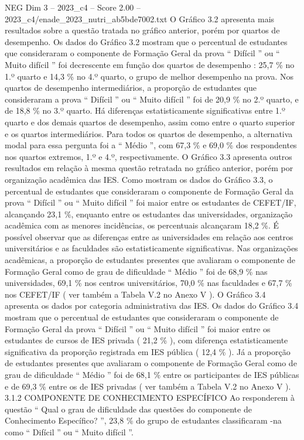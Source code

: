 \begin{textsample}{NEG Dim 3 – 2023\_c4 – Score 2.00 – 2023\_c4/enade\_2023\_nutri\_ab5bde7002.txt}
O Gráfico 3.2 apresenta mais resultados sobre a questão tratada no gráfico anterior, porém por quartos de desempenho.
Os dados do Gráfico 3.2 mostram que o percentual de estudantes que consideraram o componente de Formação Geral da prova “ Difícil ” ou “ Muito difícil ” foi decrescente em função dos quartos de desempenho : 25,7 \% no 1.º quarto e 14,3 \% no 4.º quarto, o grupo de melhor desempenho na prova.
Nos quartos de desempenho intermediários, a proporção de estudantes que consideraram a prova “ Difícil ” ou “ Muito difícil ” foi de 20,9 \% no 2.º quarto, e de 18,8 \% no 3.º quarto.
Há diferenças estatisticamente significativas entre 1.º quarto e dos demais quartos de desempenho, assim como entre o quarto superior e os quartos intermediários.
Para todos os quartos de desempenho, a alternativa modal para essa pergunta foi a “ Médio ”, com 67,3 \% e 69,0 \% dos respondentes nos quartos extremos, 1.º e 4.º, respectivamente.
O Gráfico 3.3 apresenta outros resultados em relação à mesma questão retratada no gráfico anterior, porém por organização acadêmica das IES.
Como mostram os dados do Gráfico 3.3, o percentual de estudantes que consideraram o componente de Formação Geral da prova “ Difícil ” ou “ Muito difícil ” foi maior entre os estudantes de CEFET/IF, alcançando 23,1 \%, enquanto entre os estudantes das universidades, organização acadêmica com as menores incidências, os percentuais alcançaram 18,2 \%.
É possível observar que as diferenças entre as universidades em relação aos centros universitários e as faculdades são estatisticamente significativas.
Nas organizações acadêmicas, a proporção de estudantes presentes que avaliaram o componente de Formação Geral como de grau de dificuldade “ Médio ” foi de 68,9 \% nas universidades, 69,1 \% nos centros universitários, 70,0 \% nas faculdades e 67,7 \% nos CEFET/IF ( ver também a Tabela V.2 no Anexo V ).
O Gráfico 3.4 apresenta os dados por categoria administrativa das IES.
Os dados do Gráfico 3.4 mostram que o percentual de estudantes que consideraram o componente de Formação Geral da prova “ Difícil ” ou “ Muito difícil ” foi maior entre os estudantes de cursos de IES privada ( 21,2 \% ), com diferença estatisticamente significativa da proporção registrada em IES pública ( 12,4 \% ).
Já a proporção de estudantes presentes que avaliaram o componente de Formação Geral como de grau de dificuldade “ Médio ” foi de 68,1 \% entre os participantes de IES públicas e de 69,3 \% entre os de IES privadas ( ver também a Tabela V.2 no Anexo V ). 3.1.2 COMPONENTE DE CONHECIMENTO ESPECÍFICO Ao responderem à questão “ Qual o grau de dificuldade das questões do componente de Conhecimento Específico? ”, 23,8 \% do grupo de estudantes classificaram -na como “ Difícil ” ou “ Muito difícil ”.

\end{textsample}
